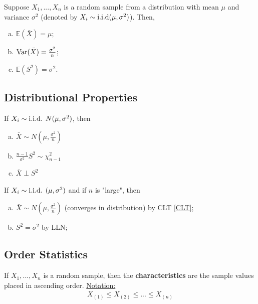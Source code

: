 \documentclass[11pt]{elegantbook}
\begin{document}
\begin{theorem}
    Suppose $X_1,...,X_n$ is a random sample from a distribution with mean $\mu$ and variance $\sigma^2$ (denoted by $X_i\sim \textnormal{i.i.d}(\mu,\sigma^2)$). Then,
    \begin{enumerate}[(a).]
        \item $\mathbb{E}(\bar{X})=\mu$;
        \item $\textnormal{Var}(\bar{X})=\frac{\sigma^2}{n}$;
        \item $\mathbb{E}(S^2)=\sigma^2$.
    \end{enumerate}
\end{theorem}


\subsection{Distributional Properties}
\begin{theorem}
    If $X_i\sim \textnormal{i.i.d. } N(\mu,\sigma^2)$, then
    \begin{enumerate}[(a).]
        \item $\bar{X}\sim N(\mu,\frac{\sigma^2}{n})$
        \item $\frac{n-1}{\sigma^2}S^2\sim \chi^2_{n-1}$
        \item $\bar{X}\perp S^2$
    \end{enumerate}
\end{theorem}

\begin{theorem}["Asymptotics"]
    If $X_i\sim \textnormal{i.i.d. } (\mu,\sigma^2)$ and if $n$ is "large", then
    \begin{enumerate}[(a).]
        \item $\bar{X}\sim N(\mu,\frac{\sigma^2}{n})$ (converges in distribution) by CLT \ref{CLT};
        \item $S^2=\sigma^2$ by LLN;
    \end{enumerate}
\end{theorem}

\subsection{Order Statistics}
\begin{definition}
    \normalfont
    If $X_1,...,X_n$ is a random sample, then the \textbf{characteristics} are the sample values placed in ascending order.
    \underline{Notation:}
    \begin{equation}
        \begin{aligned}
            X_{(1)}\leq X_{(2)}\leq ... \leq X_{(n)}
        \end{aligned}
        \nonumber
    \end{equation}
\end{definition}
\end{document}
